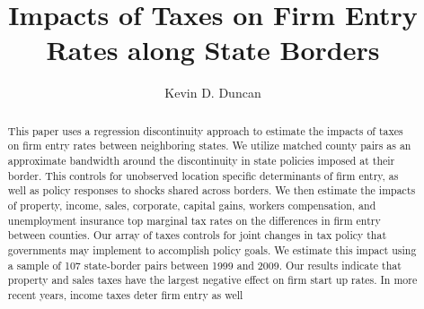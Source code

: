 \documentclass[12pt,a4paper]{article}
\renewcommand{\baselinestretch}{2}
\begin{document}
\title{Impacts of Taxes on Firm Entry Rates along State Borders}
\author{Kevin D. Duncan}
\date{}
\maketitle

\begin{abstract}
This paper uses a regression discontinuity approach to estimate the impacts of taxes on firm entry rates between neighboring states. We utilize matched county pairs as an approximate bandwidth around the discontinuity in state policies imposed at their border. This controls for unobserved location specific determinants of firm entry, as well as policy responses to shocks shared across borders. We then estimate the impacts of property, income, sales, corporate, capital gains, workers compensation, and unemployment insurance top marginal tax rates on the differences in firm entry between counties. Our array of taxes controls for joint changes in tax policy that governments may implement to accomplish policy goals. We estimate this impact using a sample of 107 state-border pairs between 1999 and 2009. Our results indicate that property and sales taxes have the largest negative effect on firm start up rates. In more recent years, income taxes deter firm entry as well
\end{abstract}

\newpage








\renewcommand{\baselinestretch}{1.0} 
\end{document}
